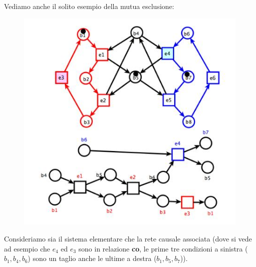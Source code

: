 \begin{esempio}
  Vediamo anche il solito esempio della mutua esclusione:
  \begin{figure}[H]
    \centering
    \includegraphics[scale = 0.5]{img/de3.jpg} 
  \end{figure}
  Consideriamo sia il sistema elementare che la rete causale associata (dove si vede ad
  esempio che $e_4$ ed $e_3$ sono in relazione \textbf{co}, le prime tre
  condizioni a sinistra ($b_1, b_4, b_6$) sono un taglio anche le
  ultime a destra ($b_1, b_5, b_7$)). 
\end{esempio}
